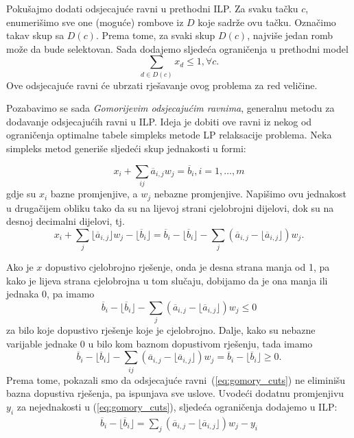 \documentclass[a4paper, utf8, 11pt, colorlinks]{book}
\begin{document}
Pokušajmo dodati odsjecajuće ravni u prethodni ILP. Za svaku tačku $c$, enumerišimo sve one (moguće) rombove iz $D$ koje sadrže ovu tačku. Označimo takav skup sa $D(c)$. Prema tome, za svaki skup $D(c)$, najviše jedan romb može da bude selektovan. Sada dodajemo sljedeća ograničenja u prethodni model
\begin{equation}
     \sum_{d \in D(c)} x_d \leq 1, \forall c.
\end{equation}
Ove odsjecajuće ravni će ubrzati rješavanje ovog problema za   red veličine.

Pozabavimo se sada \emph{Gomorijevim odsjecajućim ravnima}, generalnu metodu za dodavanje odsjecajućih ravni u ILP.  Ideja je dobiti ove ravni iz nekog od ograničenja optimalne tabele simpleks metode LP relaksacije problema. Neka simpleks metod generiše sljedeći skup jednakosti u formi:

$$x_i + \sum_{ij} \overline{a}_{i,j} w_j= \overline{b}_i, i=1, \ldots,m$$
gdje su $x_i$ bazne promjenjive, a $w_j$ nebazne promjenjive. Napišimo ovu jednakost u drugačijem obliku tako da su na lijevoj strani cjelobrojni dijelovi, dok su na desnoj decimalni dijelovi, tj.
$$x_i + \sum_{j} \lfloor \overline{a}_{i,j} \rfloor w_j - \lfloor \overline{b}_i \rfloor = \overline{b}_i - \lfloor \overline{b}_i  \rfloor    - \sum_{j} (\overline{a}_{i,j} - \lfloor \overline{a}_{i,j} \rfloor) w_j.$$

Ako je $x$ dopustivo cjelobrojno rješenje, onda je desna strana manja od 1, pa kako je lijeva strana cjelobrojna u tom slučaju, dobijamo da je ona manja ili jednaka 0, pa imamo
\begin{equation}\label{eq:gomory_cuts}
    \overline{b}_i - \lfloor \overline{b}_i  \rfloor    - \sum_{j} (\overline{a}_{i,j} - \lfloor \overline{a}_{i,j} \rfloor) w_j \leq 0
\end{equation}
za bilo koje dopustivo rješenje koje je cjelobrojno. Dalje, kako su nebazne varijable jednake 0 u bilo kom baznom dopustivom rješenju, tada imamo 
$$ \overline{b}_i - \lfloor \overline{b}_i  \rfloor    - \sum_{ij} (\overline{a}_{i,j} - \lfloor \overline{a}_{i,j} \rfloor) w_j = \overline{b}_i - \lfloor \overline{b}_i \rfloor  \geq 0.$$
Prema tome, pokazali smo da odsjecajuće ravni~(\ref{eq:gomory_cuts}) ne eliminišu bazna dopustiva rješenja, pa ispunjava sve uslove. Uvodeći dodatnu promjenjivu $y_i$ za nejednakosti u (\ref{eq:gomory_cuts}), sljedeća ograničenja dodajemo u ILP:
\begin{align}\label{gomory_cplex}
       \overline{b}_i - \lfloor \overline{b}_i \rfloor=   \sum_{j} (\overline{a}_{i,j} - \lfloor \overline{a}_{i,j} \rfloor) w_j - y_i 
\end{align}
\end{document}
